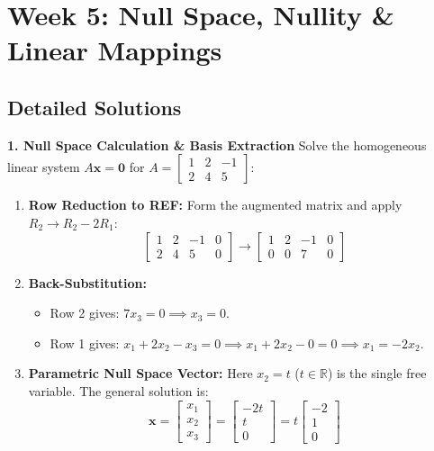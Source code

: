 \section*{Week 5: Null Space, Nullity \& Linear Mappings}

\subsection*{Detailed Solutions}

\textbf{1. Null Space Calculation \& Basis Extraction}
Solve the homogeneous linear system $A \mathbf{x} = \mathbf{0}$ for $A = \begin{bmatrix} 1 & 2 & -1 \\ 2 & 4 & 5 \end{bmatrix}$:
\begin{enumerate}
    \item \textbf{Row Reduction to REF:}
    Form the augmented matrix and apply $R_2 \to R_2 - 2R_1$:
    \begin{equation*}
    \left[\begin{array}{ccc|c} 1 & 2 & -1 & 0 \\ 2 & 4 & 5 & 0 \end{array}\right] \to \left[\begin{array}{ccc|c} 1 & 2 & -1 & 0 \\ 0 & 0 & 7 & 0 \end{array}\right]
    \end{equation*}
    \item \textbf{Back-Substitution:}
    \begin{itemize}
        \item Row 2 gives: $7x_3 = 0 \implies x_3 = 0$.
        \item Row 1 gives: $x_1 + 2x_2 - x_3 = 0 \implies x_1 + 2x_2 - 0 = 0 \implies x_1 = -2x_2$.
    \end{itemize}
    \item \textbf{Parametric Null Space Vector:}
    Here $x_2 = t$ ($t \in \mathbb{R}$) is the single free variable. The general solution is:
    \begin{equation*}
    \mathbf{x} = \begin{bmatrix} x_1 \\ x_2 \\ x_3 \end{bmatrix} = \begin{bmatrix} -2t \\ t \\ 0 \end{bmatrix} = t \begin{bmatrix} -2 \\ 1 \\ 0 \end{bmatrix}

\end{equation*}
\end{enumerate}

